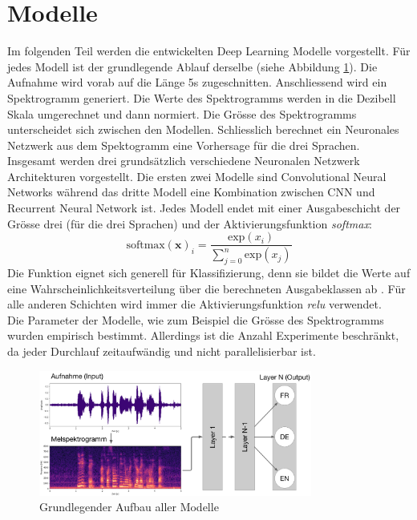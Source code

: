           \section{Modelle}
Im folgenden Teil werden die entwickelten Deep Learning Modelle vorgestellt. Für jedes Modell ist der grundlegende Ablauf derselbe (siehe Abbildung \ref{img:workflow}). Die Aufnahme wird vorab auf die Länge 5s zugeschnitten. Anschliessend wird ein Spektrogramm generiert. Die Werte des Spektrogramms werden in die Dezibell Skala umgerechnet und dann normiert. Die Grösse des Spektrogramms unterscheidet sich zwischen den Modellen. Schliesslich berechnet ein Neuronales Netzwerk aus dem Spektogramm eine Vorhersage für die drei Sprachen. 
\\
Insgesamt werden drei grundsätzlich verschiedene Neuronalen Netzwerk Architekturen vorgestellt. Die ersten zwei Modelle sind Convolutional Neural Networks während das dritte Modell eine Kombination zwischen CNN und Recurrent Neural Network ist. Jedes Modell endet mit einer Ausgabeschicht der Grösse drei (für die drei Sprachen) und der Aktivierungsfunktion \textit{softmax}:
$$ \text{softmax}(\boldsymbol x)_i = \frac{\text{exp}(x_i)}{\sum_{j=0}^{n} \text{exp}(x_j)}$$
Die Funktion eignet sich generell für Klassifizierung, denn sie bildet die Werte auf eine Wahrscheinlichkeitsverteilung über die berechneten Ausgabeklassen ab \parencite[][S. 180-184]{goodfellow}. Für alle anderen Schichten wird immer die Aktivierungsfunktion \textit{relu} verwendet.
\\
Die Parameter der Modelle, wie zum Beispiel die Grösse des Spektrogramms wurden empirisch bestimmt. Allerdings ist die Anzahl Experimente beschränkt, da jeder Durchlauf zeitaufwändig und nicht parallelisierbar ist.
\begin{figure}[hbt]
	\centering
		\includegraphics[width=0.8\textwidth]{assets/modelflow.png}
	\caption{Grundlegender Aufbau aller Modelle}
	\label{img:workflow}
\end{figure}


